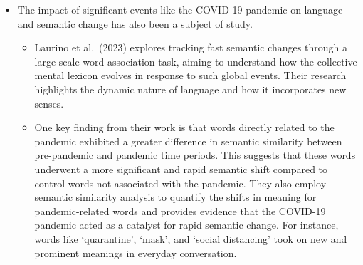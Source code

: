 \begin{itemize}
    \item {} The impact of significant events like the COVID-19 pandemic on language and semantic change has also been a subject of study.
    \begin{itemize}
        \item Laurino et al.\ (2023) explores tracking fast semantic changes through a large-scale word association task, aiming to understand how the collective mental lexicon evolves in response to such global events.
            Their research highlights the dynamic nature of language and how it incorporates new senses.
        \item One key finding from their work is that words directly related to the pandemic exhibited a greater difference in semantic similarity between pre-pandemic and pandemic time periods.
            This suggests that these words underwent a more significant and rapid semantic shift compared to control words not associated with the pandemic.
            They also employ semantic similarity analysis to quantify the shifts in meaning for pandemic-related words and provides evidence that the COVID-19 pandemic acted as a catalyst for rapid semantic change.
            For instance, words like `quarantine', `mask', and `social distancing' took on new and prominent meanings in everyday conversation.
    \end{itemize}
\end{itemize}


